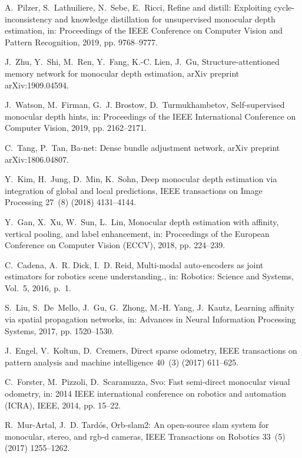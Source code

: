 \documentclass[5p]{elsarticle}
\begin{document}
\begin{thebibliography}{100}
A.~Pilzer, S.~Lathuiliere, N.~Sebe, E.~Ricci, Refine and distill: Exploiting
  cycle-inconsistency and knowledge distillation for unsupervised monocular
  depth estimation, in: Proceedings of the IEEE Conference on Computer Vision
  and Pattern Recognition, 2019, pp. 9768--9777.

J.~Zhu, Y.~Shi, M.~Ren, Y.~Fang, K.-C. Lien, J.~Gu, Structure-attentioned
  memory network for monocular depth estimation, arXiv preprint
  arXiv:1909.04594.

J.~Watson, M.~Firman, G.~J. Brostow, D.~Turmukhambetov, Self-supervised
  monocular depth hints, in: Proceedings of the IEEE International Conference
  on Computer Vision, 2019, pp. 2162--2171.

C.~Tang, P.~Tan, Ba-net: Dense bundle adjustment network, arXiv preprint
  arXiv:1806.04807.

Y.~Kim, H.~Jung, D.~Min, K.~Sohn, Deep monocular depth estimation via
  integration of global and local predictions, IEEE transactions on Image
  Processing 27~(8) (2018) 4131--4144.

Y.~Gan, X.~Xu, W.~Sun, L.~Lin, Monocular depth estimation with affinity,
  vertical pooling, and label enhancement, in: Proceedings of the European
  Conference on Computer Vision (ECCV), 2018, pp. 224--239.

C.~Cadena, A.~R. Dick, I.~D. Reid, Multi-modal auto-encoders as joint
  estimators for robotics scene understanding., in: Robotics: Science and
  Systems, Vol.~5, 2016, p.~1.

S.~Liu, S.~De~Mello, J.~Gu, G.~Zhong, M.-H. Yang, J.~Kautz, Learning affinity
  via spatial propagation networks, in: Advances in Neural Information
  Processing Systems, 2017, pp. 1520--1530.

J.~Engel, V.~Koltun, D.~Cremers, Direct sparse odometry, IEEE transactions on
  pattern analysis and machine intelligence 40~(3) (2017) 611--625.

C.~Forster, M.~Pizzoli, D.~Scaramuzza, Svo: Fast semi-direct monocular visual
  odometry, in: 2014 IEEE international conference on robotics and automation
  (ICRA), IEEE, 2014, pp. 15--22.

R.~Mur-Artal, J.~D. Tard{\'o}s, Orb-slam2: An open-source slam system for
  monocular, stereo, and rgb-d cameras, IEEE Transactions on Robotics 33~(5)
  (2017) 1255--1262.


\end{thebibliography}
\end{document}
